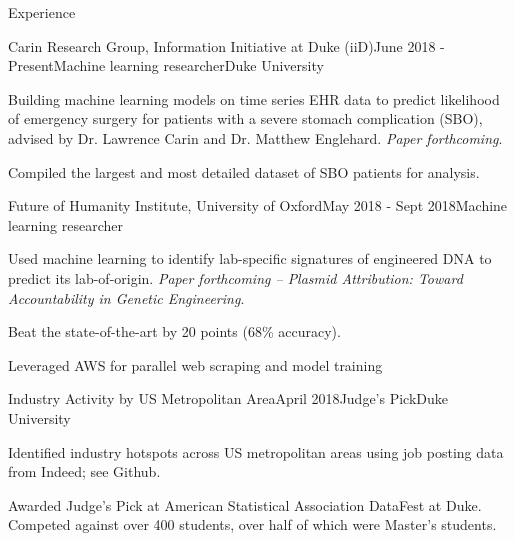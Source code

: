 \documentclass{resume} %
\begin{document}
\begin{rSection}{Experience}

\begin{rSubsection}{Carin Research Group, Information Initiative at Duke (iiD)}{June 2018 - Present}{Machine learning researcher}{Duke University}
\item Building machine learning models on time series EHR data to predict likelihood of emergency surgery for patients with a severe stomach complication (SBO), advised by Dr. Lawrence Carin and Dr. Matthew Englehard. \textit{Paper forthcoming}.
\item Compiled the largest and most detailed dataset of SBO patients for analysis.

\end{rSubsection}

\begin{rSubsection}{Future of Humanity Institute, University of Oxford}{May 2018 - Sept 2018}{Machine learning researcher}{}
\item Used machine learning to identify lab-specific signatures of engineered DNA to predict its lab-of-origin. \textit{Paper forthcoming -- Plasmid Attribution: Toward Accountability in Genetic Engineering}.
\item Beat the state-of-the-art by 20 points (68\% accuracy).
\item Leveraged AWS for parallel web scraping and model training
\end{rSubsection}


\begin{rSubsection}{Industry Activity by US Metropolitan Area}{April 2018}{Judge's Pick}{Duke University}
\item Identified industry hotspots across US metropolitan areas using job posting data from Indeed; see Github.
\item Awarded Judge's Pick at American Statistical Association DataFest at Duke. Competed against over 400 students, over half of which were Master's students.
\end{rSubsection}


\end{rSection}
\end{document}

